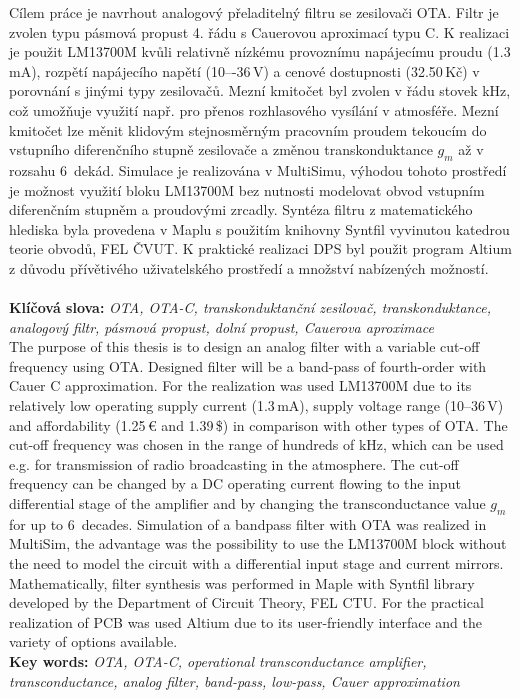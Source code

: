 \noindent Cílem práce je navrhout analogový přeladitelný filtru se zesilovači OTA. Filtr je zvolen typu pásmová propust 4. řádu s Cauerovou aproximací typu C. K realizaci je použit LM13700M kvůli relativně nízkému provoznímu napájecímu proudu (1.3\,mA), rozpětí napájecího napětí (10–-36\,V) a cenové dostupnosti (32.50\,Kč) v porovnání s jinými typy zesilovačů. Mezní kmitočet byl zvolen v řádu stovek kHz, což umožňuje využití např. pro přenos rozhlasového vysílání v atmosféře. Mezní kmitočet lze měnit klidovým stejnosměrným pracovním proudem tekoucím do vstupního diferenčního stupně zesilovače a změnou transkonduktance $g_m$ až v rozsahu 6~dekád. Simulace je realizována v MultiSimu, výhodou tohoto prostředí je možnost využití bloku LM13700M bez nutnosti modelovat obvod vstupním diferenčním stupněm a proudovými zrcadly. Syntéza filtru z matematického hlediska byla provedena v Maplu s použitím knihovny Syntfil vyvinutou katedrou teorie obvodů, FEL ČVUT. K praktické realizaci DPS byl použit program Altium z důvodu přívětivého uživatelského prostředí a množství nabízených možností. \\
\\
\noindent \textbf{Klíčová slova:} \textit{OTA, OTA-C, transkonduktanční zesilovač, transkonduktance, analogový filtr, pásmová propust, dolní propust, Cauerova aproximace}\\

\noindent The purpose of this thesis is to design an analog filter with a variable cut-off frequency using OTA. Designed filter will be a band-pass of fourth-order with Cauer C approximation. For the realization was used LM13700M due to its relatively low operating supply current (1.3\,mA), supply voltage range (10--36\,V) and affordability (1.25\,\euro{} and 1.39\,\$) in comparison with other types of OTA. The cut-off frequency was chosen in the range of hundreds of kHz, which can be used e.g. for transmission of radio broadcasting in the atmosphere. The cut-off frequency can be changed by a DC operating current flowing to the input differential stage of the amplifier and by changing the transconductance value $g_m$ for up to 6~decades. Simulation of a bandpass filter with OTA was realized in MultiSim, the advantage was the possibility to use the LM13700M block without the need to model the circuit with a differential input stage and current mirrors. Mathematically, filter synthesis was performed in Maple with Syntfil library developed by the Department of Circuit Theory, FEL CTU. For the practical realization of PCB was used Altium due to its user-friendly interface and the variety of options available. \\

\noindent \textbf{Key words:} \textit{OTA, OTA-C, operational transconductance amplifier, transconductance, analog filter, band-pass, low-pass, Cauer approximation} \\